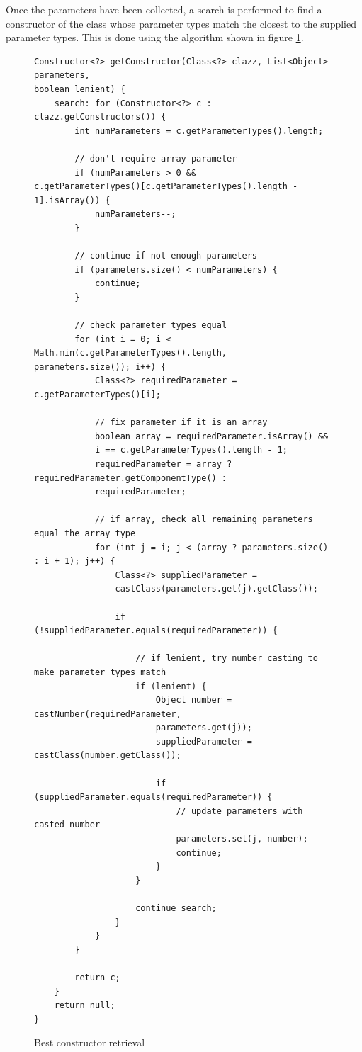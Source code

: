 Once the parameters have been collected, a search is performed to find a constructor of the class whose parameter types match the closest to the supplied parameter types. This is done using the  algorithm shown in figure \ref{fig:best_constructor}.
\begin{figure}
\centering
\caption{Best constructor retrieval}
\label{fig:best_constructor}
\begin{verbatim}
Constructor<?> getConstructor(Class<?> clazz, List<Object> parameters, 
boolean lenient) {
    search: for (Constructor<?> c : clazz.getConstructors()) {
        int numParameters = c.getParameterTypes().length;

        // don't require array parameter
        if (numParameters > 0 && 
c.getParameterTypes()[c.getParameterTypes().length - 1].isArray()) {
            numParameters--;
        }

        // continue if not enough parameters
        if (parameters.size() < numParameters) {
            continue;
        }

        // check parameter types equal
        for (int i = 0; i < Math.min(c.getParameterTypes().length, 
parameters.size()); i++) {
            Class<?> requiredParameter = c.getParameterTypes()[i];

            // fix parameter if it is an array
            boolean array = requiredParameter.isArray() && 
            i == c.getParameterTypes().length - 1;
            requiredParameter = array ? requiredParameter.getComponentType() :
            requiredParameter;

            // if array, check all remaining parameters equal the array type
            for (int j = i; j < (array ? parameters.size() : i + 1); j++) {
                Class<?> suppliedParameter =
                castClass(parameters.get(j).getClass());

                if (!suppliedParameter.equals(requiredParameter)) {

                    // if lenient, try number casting to make parameter types match
                    if (lenient) {
                        Object number = castNumber(requiredParameter, 
                        parameters.get(j));
                        suppliedParameter = castClass(number.getClass());

                        if (suppliedParameter.equals(requiredParameter)) {
                            // update parameters with casted number
                            parameters.set(j, number);
                            continue;
                        }
                    }

                    continue search;
                }
            }
        }

        return c;
    }
    return null;
}
\end{verbatim}
\end{figure}
